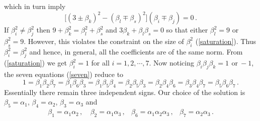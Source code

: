 \documentclass[a4paper,11pt]{article}
\begin{document}
which in turn imply
\begin{equation}
\bigg[(3\pm\beta_{k})^{2}-(\beta_{l}\mp\beta_{s})^{2}\bigg](\beta_{i}\mp\beta_{j})=0\,.
\end{equation}
If $\beta_{i}^{2}\neq\beta_{j}^{2}$ then  $9+\beta_{k}^{2}=\beta_{l}^{2}+\beta_{s}^{2}$ and $3\beta_{k}+\beta_{l}\beta_{s}=0$ so that     either
$\beta_{l}^{2}=9$ or $\beta_{s}^{2}=9$. However, this violates the constraint on the size of $\beta_{i}^{2}$ (\ref{saturation}). Thus
$\beta_{i}^{2}=\beta_{j}^{2}$ and hence,  in general,  all the coefficients are of the same norm.  From (\ref{saturation}) we get  $\beta_{i}^{2}=1$
for all $i=1,2,\cdots,7$.  Now noticing $\beta_{i}\beta_{j}\beta_{k}=1\,~\mbox{or}~-1$,  the seven equations (\ref{seven}) reduce to
\begin{equation}
1=\beta_{1}\beta_{2}\beta_{7}=\beta_{1}\beta_{6}\beta_{3}=\beta_{1}\beta_{5}\beta_{4}
=\beta_{2}\beta_{5}\beta_{3}=\beta_{2}\beta_{4}\beta_{6}=\beta_{3}\beta_{4}\beta_{7}=
\beta_{5}\beta_{6}\beta_{7}\,.
\label{beta2}
\end{equation}
Essentially there remain three independent signs. Our choice of the solution is $\beta_{5}=\alpha_{1}$,
$\beta_{4}=\alpha_{2}$, $\beta_{3}=\alpha_{3}$ and
\begin{equation}
\begin{array}{llll}
\beta_{1}=\alpha_{1}\alpha_{2}\,,~&\beta_{2}=\alpha_{1}\alpha_{3}\,,&\beta_{6}=\alpha_{1}\alpha_{2}\alpha_{3}\,,
&\beta_{7}=\alpha_{2}\alpha_{3}\,.
\end{array}
\label{alpha}
\end{equation}


\newpage
\end{document}
